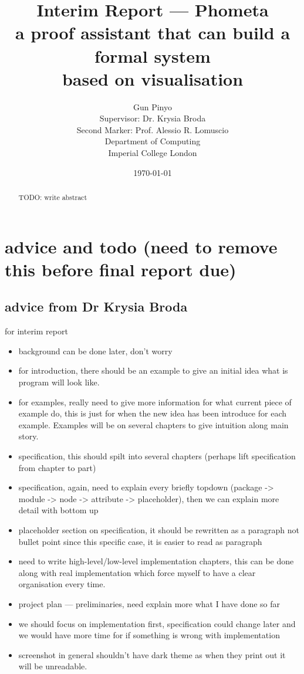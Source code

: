 \documentclass[11pt, a4paper]{report}
\title{
    Interim Report --- Phometa \\
    a proof assistant that can build a formal system \\
    based on visualisation
}
\author{
    Gun Pinyo \\
    Supervisor: Dr. Krysia Broda\\
    Second Marker: Prof. Alessio R. Lomuscio\\
    Department of Computing \\
    Imperial College London
}
\date{\today}
\begin{document}
\maketitle
\thispagestyle{empty}

\begin{abstract}
TODO: write abstract
\end{abstract}

\tableofcontents

\section{advice and todo (need to remove this before final report due)}
\subsection{advice from Dr Krysia Broda}
for interim report
\begin{itemize}
  \item background can be done later, don't worry
  \item for introduction, there should be an example to give an initial idea
    what is program will look like.
  \item for examples, really need to give more information for what current
    piece of example do, this is just for when the new idea has been introduce
    for each example. Examples will be on several chapters to give intuition
    along main story.
  \item specification, this should spilt into several chapters (perhaps lift
    specification from chapter to part)
  \item specification, again, need to explain every briefly topdown (package ->
    module -> node -> attribute -> placeholder),  then we can explain more
    detail with bottom up
  \item placeholder section on specification, it should be rewritten as a
    paragraph not bullet point since this specific case, it is easier to read
    as paragraph
  \item need to write high-level/low-level implementation chapters, this can be
    done along with real implementation which force myself to have a clear
    organisation every time.
  \item project plan --- preliminaries, need explain more what I have done so
    far
  \item we should focus on implementation first, specification could change
    later and we would have more time for if something is wrong with
    implementation
  \item screenshot in general shouldn't have dark theme as when they print out
    it will be unreadable.
\end{itemize}










\printbibliography\
\end{document}
